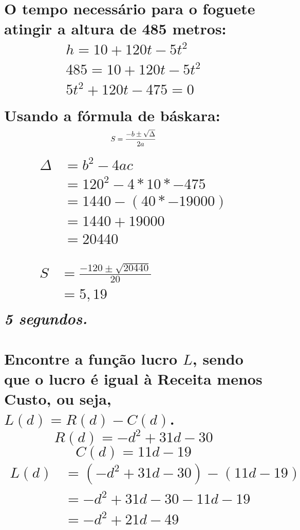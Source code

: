 \documentclass{jhwhw}
\begin{document}
\part{
	O tempo necessário para o foguete atingir a altura de 485 metros:
	\begin{gather*}
		h = 10 + 120t - 5t^2    \\
		485 = 10 + 120t - 5t^2 \\
		5t^2 + 120t - 475 = 0\\
	\end{gather*}
	Usando a fórmula de báskara:
	\begin{equation*}
		S = \frac{-b \pm \sqrt{\Delta}}{2a} \\
	\end{equation*}
	\begin{gather*}
		\begin{split}
			\Delta & = b^2-4ac            \\
			       & = 120^2 - 4*10*-475  \\
			       & = 1440 - (40*-19000) \\
			       & = 1440 + 19000       \\
			       & = 20440              \\
		\end{split}
		\\
		\begin{split}
			S & = \frac{-120 \pm \sqrt{20440}}{20} \\
			  & = 5, 19
		\end{split}
	\end{gather*}
	\emph{5 segundos.}
}
\setcounter{SubProblemNum}{0}
\part{
	Encontre a função lucro $L$, sendo que o lucro é igual à Receita menos Custo, ou seja, $L(d) = R(d) - C(d)$.
	\begin{equation*}
		R(d) = -d^2 + 31d-30
	\end{equation*}
	\begin{equation*}
		C(d) = 11d - 19
	\end{equation*}
	\begin{equation} \label{lucro}
		\begin{split}
			L(d) & = (-d^2 + 31d - 30) - (11d - 19) \\
			     & = -d^2 + 31d - 30 - 11d - 19     \\
			     & = -d^2 + 21d - 49                \\
		\end{split}
	\end{equation}
}
\end{document}

